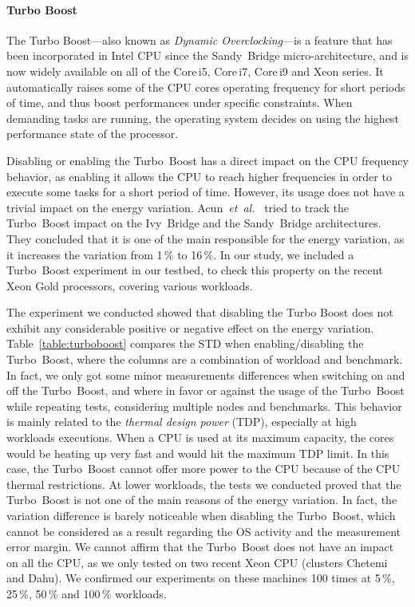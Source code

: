 \paragraph{Turbo Boost}
The Turbo Boost---also known as \emph{Dynamic Overclocking}---is a feature that has been incorporated in Intel CPU since the Sandy~Bridge micro-architecture, and is now widely available on all of the Core\,i5, Core\,i7, Core\,i9 and Xeon series.
It automatically raises some of the CPU cores operating frequency for short periods of time, and thus boost performances under specific constraints.
When demanding tasks are running, the operating system decides on using the highest performance state of the processor.

Disabling or enabling the Turbo~Boost has a direct impact on the CPU frequency behavior, as enabling it allows the CPU to reach higher frequencies in order to execute some tasks for a short period of time.
However, its usage does not have a trivial impact on the energy variation.
Acun~\emph{et~al.}~\cite{acun_variation_2016} tried to track the Turbo~Boost impact on the Ivy~Bridge and the Sandy~Bridge architectures.
They concluded that it is one of the main responsible for the energy variation, as it increases the variation from 1\,\% to 16\,\%.
In our study, we included a Turbo~Boost experiment in our testbed, to check this property on the recent Xeon Gold processors, covering various workloads.

The experiment we conducted showed that disabling the Turbo Boost does not exhibit any considerable positive or negative effect on the energy variation.
Table~\ref{table:turboboost} compares the STD when enabling/disabling the Turbo~Boost, where the columns are a combination of workload and benchmark.
In fact, we only got some minor measurements differences when switching on and off the Turbo~Boost, and where in favor or against the usage of the Turbo~Boost while repeating tests, considering multiple nodes and benchmarks.
This behavior is mainly related to the \emph{thermal design power} (TDP), especially at high workloads executions.
When a CPU is used at its maximum capacity, the cores would be heating up very fast and would hit the maximum TDP limit.
In this case, the Turbo~Boost cannot offer more power to the CPU because of the CPU thermal restrictions.
At lower workloads, the tests we conducted proved that the Turbo~Boost is not one of the main reasons of the energy variation.
In fact, the variation difference is barely noticeable when disabling the Turbo~Boost, which cannot be considered as a result regarding the OS activity and the measurement error margin.
We cannot affirm that the Turbo~Boost does not have an impact on all the CPU, as we only tested on two recent Xeon CPU (clusters \textsf{Chetemi} and \textsf{Dahu}).
We confirmed our experiments on these machines 100 times at 5\,\%, 25\,\%, 50\,\% and 100\,\% workloads.

